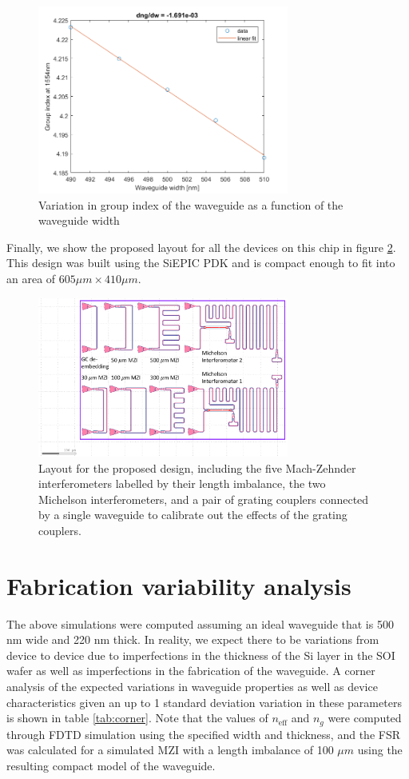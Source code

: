 \documentclass[journal]{IEEEtran}
\begin{document}
\begin{figure}[t!]
  \centering
  \includegraphics[width = 3.25in]{fig/dngdw.png}
  \caption{Variation in group index of the waveguide as a function of the waveguide width}
  \label{fig:dngdw}
\end{figure}

Finally, we show the proposed layout for all the devices on this chip in figure \ref{fig:layout}. This design was built using the SiEPIC PDK and is compact enough to fit into an area of $605 \mu m \times 410 \mu m $.

\begin{figure}[t!]
  \centering
  \includegraphics[width = 3.25in]{fig/layout.png}
  \caption{Layout for the proposed design, including the five Mach-Zehnder interferometers labelled by their length imbalance, the two Michelson interferometers, and a pair of grating couplers connected by a single waveguide to calibrate out the effects of the grating couplers.}
  \label{fig:layout}
\end{figure}

\section{Fabrication variability analysis}

The above simulations were computed assuming an ideal waveguide that is 500 nm wide and 220 nm thick. In reality, we expect there to be variations from device to device due to imperfections in the thickness of the Si layer in the SOI wafer as well as imperfections in the fabrication of the waveguide. A corner analysis of the expected variations in waveguide properties as well as device characteristics given an up to 1 standard deviation variation in these parameters is shown in table \ref{tab:corner}. Note that the values of $n_{\text{eff}}$ and $n_g$ were computed through FDTD simulation using the specified width and  thickness, and the FSR was calculated for a simulated MZI with a length imbalance of 100 $\mu m$ using the resulting compact model of the waveguide.
\end{document}
